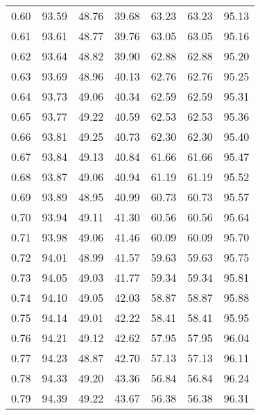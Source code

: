 \begin{tabular}{|c|c|c|c|c|c|c|}
      0.60 &     93.59 &     48.76 &      39.68 &   63.23 &      63.23 &         95.13 \\
      0.61 &     93.61 &     48.77 &      39.76 &   63.05 &      63.05 &         95.16 \\
      0.62 &     93.64 &     48.82 &      39.90 &   62.88 &      62.88 &         95.20 \\
      0.63 &     93.69 &     48.96 &      40.13 &   62.76 &      62.76 &         95.25 \\
      0.64 &     93.73 &     49.06 &      40.34 &   62.59 &      62.59 &         95.31 \\
      0.65 &     93.77 &     49.22 &      40.59 &   62.53 &      62.53 &         95.36 \\
      0.66 &     93.81 &     49.25 &      40.73 &   62.30 &      62.30 &         95.40 \\
      0.67 &     93.84 &     49.13 &      40.84 &   61.66 &      61.66 &         95.47 \\
      0.68 &     93.87 &     49.06 &      40.94 &   61.19 &      61.19 &         95.52 \\
      0.69 &     93.89 &     48.95 &      40.99 &   60.73 &      60.73 &         95.57 \\
      0.70 &     93.94 &     49.11 &      41.30 &   60.56 &      60.56 &         95.64 \\
      0.71 &     93.98 &     49.06 &      41.46 &   60.09 &      60.09 &         95.70 \\
      0.72 &     94.01 &     48.99 &      41.57 &   59.63 &      59.63 &         95.75 \\
      0.73 &     94.05 &     49.03 &      41.77 &   59.34 &      59.34 &         95.81 \\
      0.74 &     94.10 &     49.05 &      42.03 &   58.87 &      58.87 &         95.88 \\
      0.75 &     94.14 &     49.01 &      42.22 &   58.41 &      58.41 &         95.95 \\
      0.76 &     94.21 &     49.12 &      42.62 &   57.95 &      57.95 &         96.04 \\
      0.77 &     94.23 &     48.87 &      42.70 &   57.13 &      57.13 &         96.11 \\
      0.78 &     94.33 &     49.20 &      43.36 &   56.84 &      56.84 &         96.24 \\
      0.79 &     94.39 &     49.22 &      43.67 &   56.38 &      56.38 &         96.31 \\

\end{tabular}
